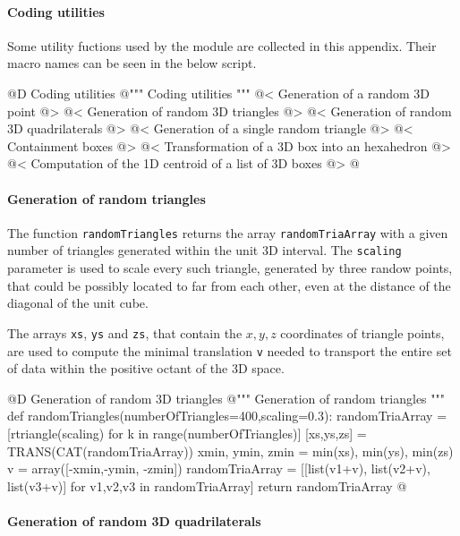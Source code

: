 \documentclass[11pt,oneside]{article}    %
\begin{document}
\paragraph{Coding utilities}

Some utility fuctions used by the module are collected in this appendix. Their macro names can be seen in the below script.

@D Coding utilities
@{""" Coding utilities """
@< Generation of a random 3D point @>
@< Generation of random 3D triangles @>
@< Generation of random 3D quadrilaterals @>
@< Generation of a single random triangle @>
@< Containment boxes @>
@< Transformation of a 3D box into an hexahedron @>
@< Computation of the 1D centroid of a list of 3D boxes @>
@}


\paragraph{Generation of random triangles}
The function \texttt{randomTriangles} returns the array \texttt{randomTriaArray} with a given number of triangles generated within the unit 3D interval. The \texttt{scaling} parameter is used to scale every such triangle, generated by three randow points, that could be possibly located to far from each other, even at the distance of the diagonal of the unit cube.

The arrays \texttt{xs}, \texttt{ys} and \texttt{zs}, that contain the $x,y,z$ coordinates of triangle points, are used to compute the minimal translation \texttt{v} needed to transport the entire set of data within the positive octant of the 3D space. 

@D Generation of random 3D triangles
@{""" Generation of random triangles """
def randomTriangles(numberOfTriangles=400,scaling=0.3):
    randomTriaArray = [rtriangle(scaling) for k in range(numberOfTriangles)]
    [xs,ys,zs] = TRANS(CAT(randomTriaArray))
    xmin, ymin, zmin = min(xs), min(ys), min(zs)
    v = array([-xmin,-ymin, -zmin])
    randomTriaArray = [[list(v1+v), list(v2+v), list(v3+v)] for v1,v2,v3 in randomTriaArray]
    return randomTriaArray
@}

\paragraph{Generation of random 3D quadrilaterals}
\end{document}
